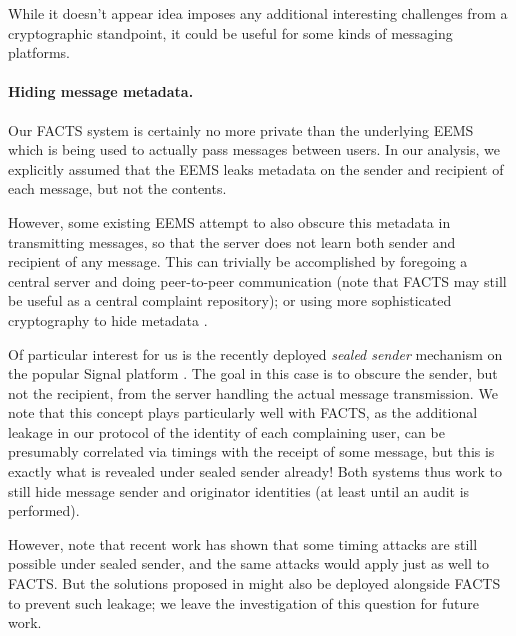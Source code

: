 While it doesn't appear idea imposes any additional interesting challenges from a cryptographic
standpoint, it could be useful for some kinds of messaging platforms.

\paragraph{Hiding message metadata.}
Our FACTS system is certainly no more private than the underlying EEMS
which is being used to actually pass messages between users. In our analysis,
we explicitly assumed that the EEMS leaks metadata on the sender and recipient of
each message, but not the contents.

However, some existing EEMS attempt to also obscure this metadata in transmitting
messages, so that the server does not learn both sender and recipient of any
message. This can trivially be accomplished by foregoing a central server and
doing peer-to-peer communication (note that FACTS may still be useful as a central
complaint repository); or using more sophisticated cryptography to
hide metadata \cite{stadium,verdict,ricochet}.

Of particular interest for us is the recently deployed \emph{sealed sender}
mechanism on the popular Signal platform \cite{signal-ss}. The goal in this
case is to obscure the sender, but not the recipient, from the server handling
the actual message transmission. We note that this concept plays particularly
well with FACTS, as the additional leakage in our protocol of the identity
of each complaining user, can be presumably correlated via timings with the
receipt of some message, but this is exactly what is revealed under sealed sender
already! Both systems thus work to still hide message sender and originator identities
(at least until an audit is performed).

However, note that recent work \cite{signal-ndss21} has shown that some timing
attacks are still possible under sealed sender, and the same attacks would apply
just as well to FACTS. But the solutions proposed in \cite{signal-ndss21} might also
be deployed alongside FACTS to prevent such leakage; we leave the investigation of
this question for future work.



